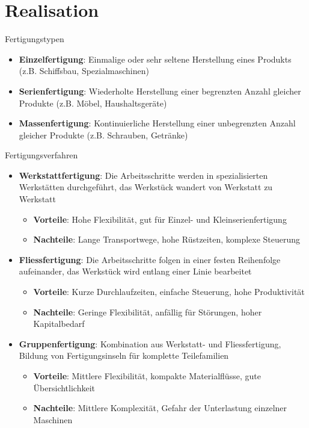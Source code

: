 \section{Realisation}

\begin{definition}{Fertigungstypen}
\begin{itemize}
    \item \textbf{Einzelfertigung}: Einmalige oder sehr seltene Herstellung eines Produkts (z.B. Schiffsbau, Spezialmaschinen)
    \item \textbf{Serienfertigung}: Wiederholte Herstellung einer begrenzten Anzahl gleicher Produkte (z.B. Möbel, Haushaltsgeräte)
    \item \textbf{Massenfertigung}: Kontinuierliche Herstellung einer unbegrenzten Anzahl gleicher Produkte (z.B. Schrauben, Getränke)
\end{itemize}
\end{definition}



\begin{definition}{Fertigungsverfahren}
\begin{itemize}
    \item \textbf{Werkstattfertigung}: Die Arbeitsschritte werden in spezialisierten Werkstätten durchgeführt, das Werkstück wandert von Werkstatt zu Werkstatt
    \begin{itemize}
        \item \textbf{Vorteile}: Hohe Flexibilität, gut für Einzel- und Kleinserienfertigung
        \item \textbf{Nachteile}: Lange Transportwege, hohe Rüstzeiten, komplexe Steuerung
    \end{itemize}
    \item \textbf{Fliessfertigung}: Die Arbeitsschritte folgen in einer festen Reihenfolge aufeinander, das Werkstück wird entlang einer Linie bearbeitet
    \begin{itemize}
        \item \textbf{Vorteile}: Kurze Durchlaufzeiten, einfache Steuerung, hohe Produktivität
        \item \textbf{Nachteile}: Geringe Flexibilität, anfällig für Störungen, hoher Kapitalbedarf
    \end{itemize}
    \item \textbf{Gruppenfertigung}: Kombination aus Werkstatt- und Fliessfertigung, Bildung von Fertigungsinseln für komplette Teilefamilien
    \begin{itemize}
        \item \textbf{Vorteile}: Mittlere Flexibilität, kompakte Materialflüsse, gute Übersichtlichkeit
        \item \textbf{Nachteile}: Mittlere Komplexität, Gefahr der Unterlastung einzelner Maschinen
    \end{itemize}
\end{itemize}
\end{definition}



